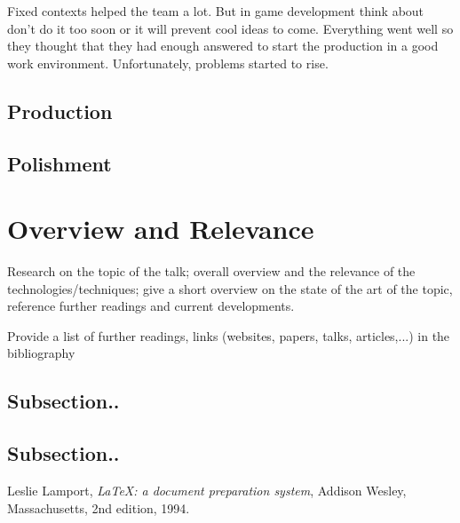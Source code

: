 \documentclass[a4paper]{article}
\begin{document}
\noindent Fixed contexts helped the team a lot. But in game development think about don't do it too 
soon or it will prevent cool ideas to come. Everything went well so they thought that they had enough
answered to start the production in a good work environment. Unfortunately, problems started to rise.






\subsection{Production}
\subsection{Polishment}

\section{Overview and Relevance}
Research on the topic of the talk; overall overview and the relevance of the technologies/techniques; give a short overview on the state of the art of the topic, reference further readings and current developments. 

Provide a list of further readings, links (websites, papers, talks, articles,...) in the bibliography  

\subsection{Subsection..}
\subsection{Subsection..}

\renewcommand{\refname}{\section{References and Further Sources}}
\begin{thebibliography}{1}

  Leslie Lamport,
  \emph{\LaTeX: a document preparation system},
  Addison Wesley, Massachusetts,
  2nd edition,
  1994.

\end{thebibliography}
\end{document}
